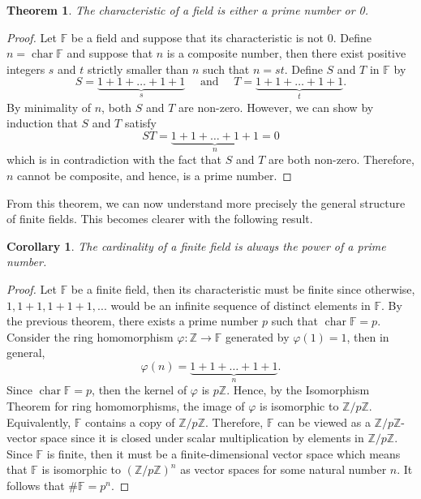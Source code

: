 \documentclass{article}
\theoremstyle{plain}
\newtheorem{theorem}{Theorem}[subsection]
\newtheorem*{corollary}{Corollary}
\theoremstyle{definition}
\newcommand{\Z}{\mathbb{Z}}
\newcommand{\F}{\mathbb{F}}
\newcommand{\Zn}[1]{\mathbb{Z}/ #1 \mathbb{Z}}
\DeclareMathOperator{\Char}{char}
\begin{document}
\begin{theorem}
\label{characteristic prime}
    The characteristic of a field is either a prime number or 0.
\end{theorem}

\begin{proof}
    Let $\F$ be a field and suppose that its characteristic is not 0. Define $n = \Char \F$ and suppose that $n$ is a composite number, then there exist positive integers $s$ and $t$ strictly smaller than $n$ such that $n = st$. Define $S$ and $T$ in $\F$ by
    $$S = \underbrace{1 + 1 + \dots + 1 + 1}_s \quad \text{ and } \quad T = \underbrace{1 + 1 + \dots + 1 + 1}_t.$$
    By minimality of $n$, both $S$ and $T$ are non-zero. However, we can show by induction that $S$ and $T$ satisfy
    $$ST = \underbrace{1 + 1 + \dots + 1 + 1}_n = 0$$
    which is in contradiction with the fact that $S$ and $T$ are both non-zero. Therefore, $n$ cannot be composite, and hence, is a prime number.
\end{proof}

From this theorem, we can now understand more precisely the general structure of finite fields. This becomes clearer with the following result.

\begin{corollary}
\label{cardinality finite field power of a prime}
    The cardinality of a finite field is always the power of a prime number.
\end{corollary}

\begin{proof}
    Let $\F$ be a finite field, then its characteristic must be finite since otherwise, $1, 1+1, 1+1+1, ...$ would be an infinite sequence of distinct elements in $\F$. By the previous theorem, there exists a prime number $p$ such that $\Char \F = p$. Consider the ring homomorphism $\varphi : \Z \to \F$ generated by $\varphi(1) = 1$, then in general,
    $$\varphi(n) = \underbrace{1 + 1 + \dots + 1 + 1}_n.$$
    Since $\Char \F = p$, then the kernel of $\varphi$ is $p\Z$. Hence, by the Isomorphism Theorem for ring homomorphisms, the image of $\varphi$ is isomorphic to $\Zn{p}$. Equivalently, $\F$ contains a copy of $\Zn{p}$. Therefore, $\F$ can be viewed as a $\Zn{p}$-vector space since it is closed under scalar multiplication by elements in $\Zn{p}$. Since $\F$ is finite, then it must be a finite-dimensional vector space which means that $\F$ is isomorphic to $(\Zn{p})^n$ as vector spaces for some natural number $n$. It follows that $\# \F = p^n$.
\end{proof}
\end{document}
